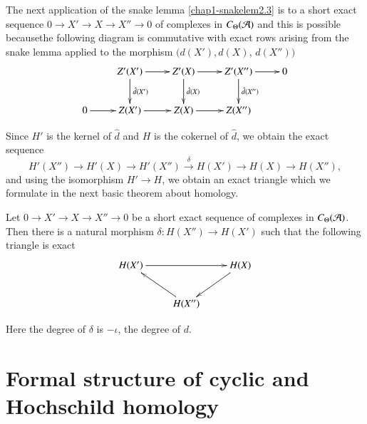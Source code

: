 The next application of the snake lemma \ref{chap1-snakelem2.3} is to
a short exact sequence $0\to X'\to X\to X''\to 0$ of complexes in
$C_{\Theta}(\mathcal{A})$ and this is possible because\pageoriginale the
following diagram is commutative with exact rows arising from the
snake lemma applied to the morphism $(d(X'),d(X)$, $d(X''))$
\[
\xymatrix{
 & Z'(X')\ar[d]^{\hat{d}(X')}\ar[r] & Z'(X)\ar[d]^{\hat{d}(X)}\ar[r] &
  Z'(X'')\ar[d]^{\hat{d}(X'')}\ar[r] & 0\\
0\ar[r] & Z(X')\ar[r] & Z(X)\ar[r] & Z(X'') &
}
\]

Since $H'$ is the kernel of $\hat{d}$ and $H$ is the cokernel of
$\hat{d}$, we obtain the exact sequence
$$
H'(X'')\to H'(X)\to H'(X'')\xrightarrow{\delta}H(X')\to H(X)\to
H(X''), 
$$
and using the isomorphism $H'\to H$, we obtain an exact triangle which
we formulate in the next basic theorem about homology.

\begin{theorem}\label{chap1-thm2.5}
Let $0\to X'\to X\to X''\to 0$ be a short exact sequence of complexes
in $C_{\Theta}(\mathcal{A})$. Then there is a natural morphism
$\delta:H(X'')\to H(X')$ such that the following triangle is exact
\[
\xymatrix{
H(X')\ar[rr] & & H(X)\ar[dl]\\
 & H(X'')\ar[ul] & 
}
\]

Here the degree of $\delta$ is $-\iota$, the degree of $d$.
\end{theorem}

\section{Formal structure of cyclic and Hochschild
  homology}\label{chap1-sec3}

